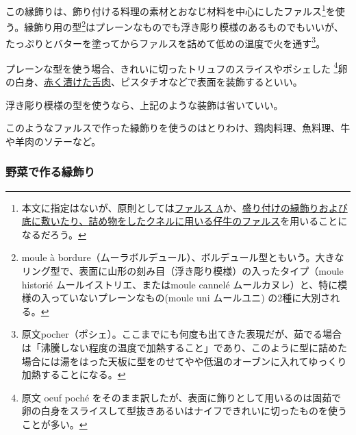 \begin{recette}
この縁飾りは、飾り付ける料理の素材とおなじ材料を中心にしたファルス\footnote{本文に指定はないが、原則としては\protect\hyperlink{farce-a}{ファルス
  A}か、\protect\hyperlink{farce-de-veau-pour-bordures}{盛り付けの縁飾りおよび底に敷いたり、詰め物をしたクネルに用いる仔牛のファルス}を用いることになるだろう。}を使う。縁飾り用の型\footnote{moule
  à
  bordure（ムーラボルデュール）、ボルデュール型ともいう。大きなリング型で、表面に山形の刻み目（浮き彫り模様）の入ったタイプ（moule
  historié ムールイストリエ、またはmoule cannelé
  ムールカヌレ）と、特に模様の入っていないプレーンなもの(moule uni
  ムールユニ) の2種に大別される。}はプレーンなものでも浮き彫り模様のあるものでもいいが、たっぷりとバターを塗ってからファルスを詰めて低めの温度で火を通す\footnote{原文pocher（ポシェ）。ここまでにも何度も出てきた表現だが、茹でる場合は「沸騰しない程度の温度で加熱すること」であり、このように型に詰めた場合には湯をはった天板に型をのせてやや低温のオーブンに入れてゆっくり加熱することになる。}。

プレーンな型を使う場合、きれいに切ったトリュフのスライスやポシェした
\footnote{原文 oeuf poché
  をそのまま訳したが、表面に飾りとして用いるのは固茹で卵の白身をスライスして型抜きあるいはナイフできれいに切ったものを使うことが多い。}卵の白身、\protect\hyperlink{saumure-liquide-pour-langues}{赤く漬けた舌肉}、ピスタチオなどで表面を装飾するといい。

浮き彫り模様の型を使うなら、上記のような装飾は省いていい。

このようなファルスで作った縁飾りを使うのはとりわけ、鶏肉料理、魚料理、牛や羊肉のソテーなど。

\hypertarget{bordures-en-legumes}{%
\subsubsection{野菜で作る縁飾り}\label{bordures-en-legumes}}




\end{recette}
